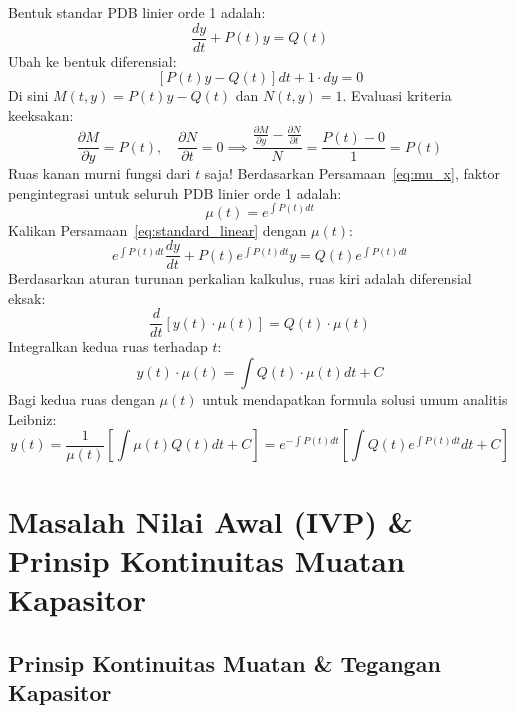 \documentclass[11pt,a4paper]{article}
\theoremstyle{definition}
\begin{document}
Bentuk standar PDB linier orde 1 adalah:
\begin{equation}
    \frac{dy}{dt} + P(t) y = Q(t)
    \label{eq:standard_linear}
\end{equation}
Ubah ke bentuk diferensial:
\begin{equation}
    \left[ P(t) y - Q(t) \right] dt + 1 \cdot dy = 0
\end{equation}
Di sini $M(t,y) = P(t)y - Q(t)$ dan $N(t,y) = 1$. Evaluasi kriteria keeksakan:
\begin{equation}
    \frac{\partial M}{\partial y} = P(t), \quad \frac{\partial N}{\partial t} = 0 \implies \frac{\frac{\partial M}{\partial y} - \frac{\partial N}{\partial t}}{N} = \frac{P(t) - 0}{1} = P(t)
\end{equation}
Ruas kanan murni fungsi dari $t$ saja! Berdasarkan Persamaan~\eqref{eq:mu_x}, faktor pengintegrasi untuk seluruh PDB linier orde 1 adalah:
\begin{equation}
    \mu(t) = e^{\int P(t) dt}
    \label{eq:linear_if}
\end{equation}
Kalikan Persamaan~\eqref{eq:standard_linear} dengan $\mu(t)$:
\begin{equation}
    e^{\int P(t) dt} \frac{dy}{dt} + P(t) e^{\int P(t) dt} y = Q(t) e^{\int P(t) dt}
\end{equation}
Berdasarkan aturan turunan perkalian kalkulus, ruas kiri adalah diferensial eksak:
\begin{equation}
    \frac{d}{dt}\left[ y(t) \cdot \mu(t) \right] = Q(t) \cdot \mu(t)
\end{equation}
Integralkan kedua ruas terhadap $t$:
\begin{equation}
    y(t) \cdot \mu(t) = \int Q(t) \cdot \mu(t) dt + C
\end{equation}
Bagi kedua ruas dengan $\mu(t)$ untuk mendapatkan formula solusi umum analitis Leibniz:
\begin{equation}
    y(t) = \frac{1}{\mu(t)} \left[ \int \mu(t) Q(t) dt + C \right] = e^{-\int P(t) dt} \left[ \int Q(t) e^{\int P(t) dt} dt + C \right]
    \label{eq:leibniz_formula}
\end{equation}

\section{Masalah Nilai Awal (IVP) \& Prinsip Kontinuitas Muatan Kapasitor}

\subsection{Prinsip Kontinuitas Muatan \& Tegangan Kapasitor}
\end{document}
